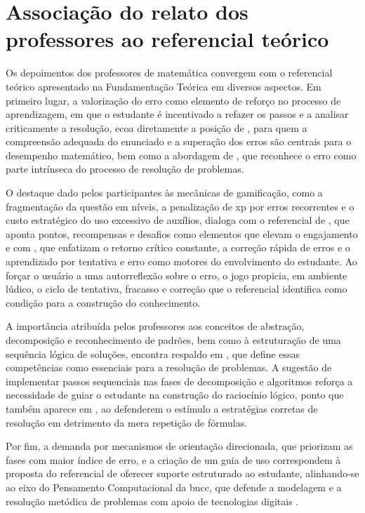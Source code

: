\section{Associação do relato dos professores ao referencial teórico}

Os depoimentos dos professores de matemática convergem com o referencial teórico apresentado na Fundamentação Teórica em diversos aspectos. Em primeiro lugar, a valorização do erro como elemento de reforço no processo de aprendizagem, em que o estudante é incentivado a refazer os passos e a analisar criticamente a resolução, ecoa diretamente a posição de , para quem a compreensão adequada do enunciado e a superação dos erros são centrais para o desempenho matemático, bem como a abordagem de , que reconhece o erro como parte intrínseca do processo de resolução de problemas.

O destaque dado pelos participantes às mecânicas de gamificação, como a fragmentação da questão em níveis, a penalização de \gls{xp} por erros recorrentes e o custo estratégico do uso excessivo de auxílios, dialoga com o referencial de , que aponta pontos, recompensas e desafios como elementos que elevam o engajamento e com , que enfatizam o retorno crítico constante, a correção rápida de erros e o aprendizado por tentativa e erro como motores do envolvimento do estudante. Ao forçar o usuário a uma autorreflexão sobre o erro, o jogo propicia, em ambiente lúdico, o ciclo de tentativa, fracasso e correção que o referencial identifica como condição para a construção do conhecimento.

A importância atribuída pelos professores aos conceitos de abstração, decomposição e reconhecimento de padrões, bem como à estruturação de uma sequência lógica de soluções, encontra respaldo em , que define essas competências como essenciais para a resolução de problemas. A sugestão de implementar passos sequenciais nas fases de decomposição e algoritmos reforça a necessidade de guiar o estudante na construção do raciocínio lógico, ponto que também aparece em , ao defenderem o estímulo a estratégias corretas de resolução em detrimento da mera repetição de fórmulas.

Por fim, a demanda por mecanismos de orientação direcionada, que priorizam as fases com maior índice de erro, e a criação de um guia de uso correspondem à proposta do referencial de oferecer suporte estruturado ao estudante, alinhando-se ao eixo do Pensamento Computacional da \gls{bncc}, que defende a modelagem e a resolução metódica de problemas com apoio de tecnologias digitais \cite{brasil2017,brasil_bncc_computacao}.

